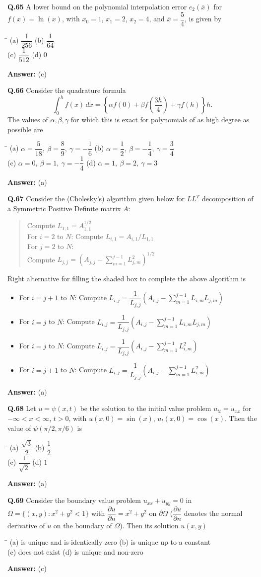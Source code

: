 \documentclass[11pt,a4paper]{article}
\newcommand{\optsfour}[4]{%
  \begin{tabbing}
    \hspace{0.48\linewidth}\=\kill
    (a) #1 \> (b) #2 \\[2pt]
    (c) #3 \> (d) #4
  \end{tabbing}%
}
\newcommand{\optslist}[4]{%
  \begin{itemize}
    \setlength{\itemsep}{2pt}\setlength{\parskip}{0pt}
    \item[(a)] #1
    \item[(b)] #2
    \item[(c)] #3
    \item[(d)] #4
  \end{itemize}%
}
\newcommand{\ans}[1]{\textbf{Answer:} #1\par\medskip}
\begin{document}
\textbf{Q.65} A lower bound on the polynomial interpolation error $e_2(\bar{x})$ for $f(x) = \ln(x)$, with $x_0 = 1$, $x_1 = 2$, $x_2 = 4$, and $\bar{x} = \dfrac{5}{4}$, is given by
\optsfour{$\dfrac{1}{256}$}{$\dfrac{1}{64}$}{$\dfrac{1}{512}$}{$0$}
\ans{(c)}

\textbf{Q.66} Consider the quadrature formula
\[
  \int_0^h f(x)\,dx = \left\{\alpha f(0) + \beta f\!\left(\frac{3h}{4}\right) + \gamma f(h)\right\}h.
\]
The values of $\alpha, \beta, \gamma$ for which this is exact for polynomials of as high degree as possible are
\optsfour{$\alpha = \dfrac{5}{18},\ \beta = \dfrac{8}{9},\ \gamma = -\dfrac{1}{6}$}{$\alpha = \dfrac{1}{2},\ \beta = -\dfrac{1}{4},\ \gamma = \dfrac{3}{4}$}{$\alpha = 0,\ \beta = 1,\ \gamma = -\dfrac{1}{4}$}{$\alpha = 1,\ \beta = 2,\ \gamma = 3$}
\ans{(a)}

\textbf{Q.67} Consider the (Cholesky's) algorithm given below for $LL^T$ decomposition of a Symmetric Positive Definite matrix $A$:
\begin{quote}
Compute $L_{1,1} = A_{1,1}^{1/2}$\\
For $i = 2$ to $N$: Compute $L_{i,1} = A_{i,1}/L_{1,1}$\\
For $j = 2$ to $N$:\\
\quad Compute $L_{j,j} = \left(A_{j,j} - \displaystyle\sum_{m=1}^{j-1} L_{j,m}^2\right)^{1/2}$\\
\end{quote}
Right alternative for filling the shaded box to complete the above algorithm is
\optslist{For $i = j + 1$ to $N$: Compute $L_{i,j} = \dfrac{1}{L_{j,j}}\left(A_{i,j} - \displaystyle\sum_{m=1}^{j-1} L_{i,m} L_{j,m}\right)$}{For $i = j$ to $N$: Compute $L_{i,j} = \dfrac{1}{L_{j,j}}\left(A_{i,j} - \displaystyle\sum_{m=1}^{j-1} L_{i,m} L_{j,m}\right)$}{For $i = j$ to $N$: Compute $L_{i,j} = \dfrac{1}{L_{j,j}}\left(A_{i,j} - \displaystyle\sum_{m=1}^{j-1} L_{i,m}^2\right)$}{For $i = j + 1$ to $N$: Compute $L_{i,j} = \dfrac{1}{L_{j,j}}\left(A_{i,j} - \displaystyle\sum_{m=1}^{j-1} L_{i,m}^2\right)$}
\ans{(a)}

\textbf{Q.68} Let $u = \psi(x,t)$ be the solution to the initial value problem $u_{tt} = u_{xx}$ for $-\infty < x < \infty$, $t > 0$, with $u(x,0) = \sin(x)$, $u_t(x,0) = \cos(x)$. Then the value of $\psi(\pi/2, \pi/6)$ is
\optsfour{$\dfrac{\sqrt{3}}{2}$}{$\dfrac{1}{2}$}{$\dfrac{1}{\sqrt{2}}$}{$1$}
\ans{(a)}

\textbf{Q.69} Consider the boundary value problem $u_{xx} + u_{yy} = 0$ in $\Omega = \{(x,y) : x^2 + y^2 < 1\}$ with $\dfrac{\partial u}{\partial n} = x^2 + y^2$ on $\partial\Omega$ ($\dfrac{\partial u}{\partial n}$ denotes the normal derivative of $u$ on the boundary of $\Omega$). Then its solution $u(x,y)$
\optsfour{is unique and is identically zero}{is unique up to a constant}{does not exist}{is unique and non-zero}
\ans{(c)}
\end{document}
